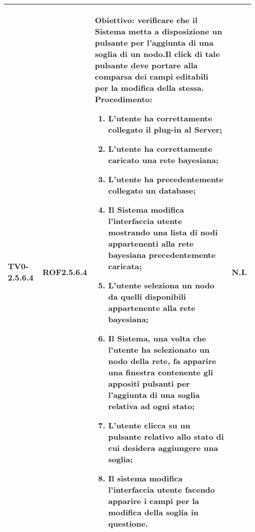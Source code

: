 \begin{longtable}{|C{.15\textwidth}|C{.13\textwidth}|m{.65\textwidth}|C{.08\textwidth}|}
TV0-2.5.6.4 & ROF2.5.6.4  &
	\textbf{Obiettivo}: verificare che il Sistema metta a disposizione un pulsante per l'aggiunta di una soglia di un nodo.Il click di tale pulsante deve portare alla comparsa dei campi editabili per la modifica della stessa. \newline
	\textbf{Procedimento}:
	\begin{enumerate}
		\item L'utente ha correttamente collegato il plug-in al Server;
		\item L'utente ha correttamente caricato una rete bayesiana;
		\item L'utente ha precedentemente collegato un database;
		\item Il Sistema modifica l'interfaccia utente mostrando una lista di nodi appartenenti alla rete bayesiana precedentemente caricata;
		\item L'utente seleziona un nodo da quelli disponibili appartenente alla rete bayesiana;
		\item Il Sistema, una volta che l'utente ha selezionato un nodo della rete, fa apparire una finestra contenente gli appositi pulsanti per l'aggiunta di una soglia relativa ad ogni stato;
		\item L'utente clicca su un pulsante relativo allo stato di cui desidera aggiungere una soglia;
		\item Il sistema modifica l'interfaccia utente facendo apparire i campi per la modifica della soglia in questione.
	\end{enumerate}
	& N.I. \\
\hline


\end{longtable}
